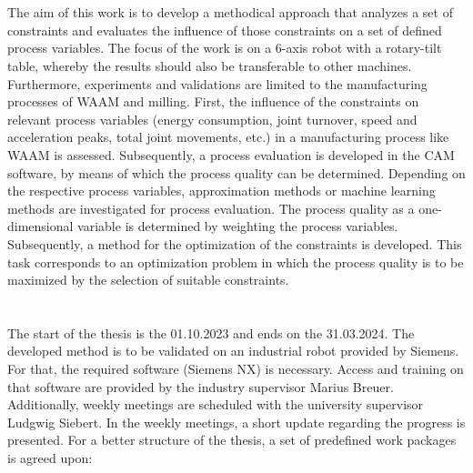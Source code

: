 \documentclass[ZLstudentexpose%
              ,optBiber%
              ,optEnglish%
              ,10pt
              ]{ZLlatex}%
\begin{document}
\newpage
\section{}%
The aim of this work is to develop a methodical approach that analyzes a set of constraints and evaluates the influence of those constraints on a set of defined process variables.
The focus of the work is on a 6-axis robot with a rotary-tilt table, whereby the results should also be transferable to other machines. Furthermore, experiments and validations are limited to the manufacturing processes of WAAM and milling.
First, the influence of the constraints on relevant process variables (energy consumption, joint turnover, speed and acceleration peaks, total joint movements, etc.) in a manufacturing process like WAAM is assessed. Subsequently, a process evaluation is developed in the CAM software, by means of which the process quality can be determined.
Depending on the respective process variables, approximation methods or machine learning methods are investigated for process evaluation. The process quality as a one-dimensional variable is determined by weighting the process variables.
Subsequently, a method for the optimization of the constraints is developed. This task corresponds to an optimization problem in which the process quality is to be maximized by the selection of suitable constraints. 

\section{}%
The start of the thesis is the 01.10.2023 and ends on the 31.03.2024. The developed method is to be validated on an industrial robot provided by Siemens. For that, the required software (Siemens NX) is necessary. Access and training on that software are provided by the industry supervisor Marius Breuer. 
Additionally, weekly meetings are scheduled with the university supervisor Ludgwig Siebert. In the weekly meetings, a short update regarding the progress is presented. \newline
For a better structure of the thesis, a set of predefined work packages is agreed upon:
\end{document}
